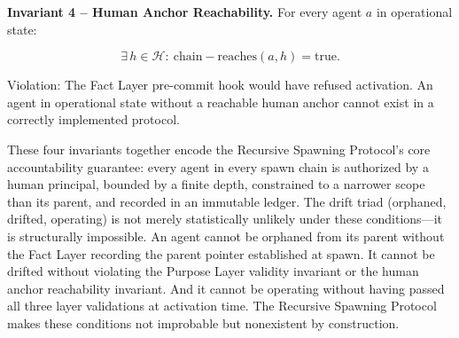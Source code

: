\bigskip
\noindent\textbf{Invariant 4 -- Human Anchor Reachability.} For every agent $a$ in operational state:

\begin{equation}
\exists\, h \in \mathcal{H}:\ \mathrm{chain-reaches}(a, h) = \mathrm{true}.
\label{eq:inv-human-anchor}
\end{equation}

Violation: The Fact Layer pre-commit hook would have refused activation. An agent in operational state without a reachable human anchor cannot exist in a correctly implemented protocol.

\bigskip
These four invariants together encode the Recursive Spawning Protocol's core accountability guarantee: every agent in every spawn chain is authorized by a human principal, bounded by a finite depth, constrained to a narrower scope than its parent, and recorded in an immutable ledger. The drift triad (orphaned, drifted, operating) is not merely statistically unlikely under these conditions---it is structurally impossible. An agent cannot be orphaned from its parent without the Fact Layer recording the parent pointer established at spawn. It cannot be drifted without violating the Purpose Layer validity invariant or the human anchor reachability invariant. And it cannot be operating without having passed all three layer validations at activation time. The Recursive Spawning Protocol makes these conditions not improbable but nonexistent by construction.
